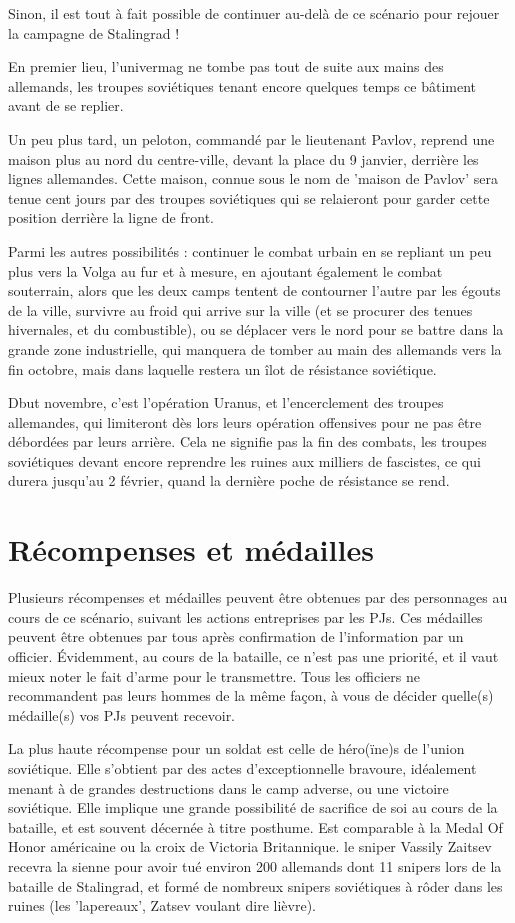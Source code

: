 \documentclass{report}
\begin{document}
\begin{multicols}{2}
Sinon, il est tout à fait possible de continuer au-delà de ce scénario pour rejouer la campagne de Stalingrad ! 

En premier lieu, l'univermag ne tombe pas tout de suite aux mains des allemands, les troupes soviétiques tenant encore quelques temps ce bâtiment avant de se replier.

Un peu plus tard, un peloton, commandé par le lieutenant Pavlov, reprend une maison plus au nord  du centre-ville, devant la place du 9 janvier, derrière les lignes allemandes. Cette maison, connue sous le nom de 'maison de Pavlov' sera tenue cent jours par des troupes soviétiques qui se relaieront pour garder cette position derrière la ligne de front.

Parmi les autres possibilités : continuer le combat urbain en se repliant un peu plus vers la Volga au fur et à mesure, en ajoutant également le combat souterrain, alors que les deux camps tentent de contourner l'autre par les égouts de la ville, survivre au froid qui arrive sur la ville (et se procurer des tenues hivernales, et du combustible), ou se déplacer vers le nord pour se battre dans la grande zone industrielle, qui manquera de tomber au main des allemands vers la fin octobre, mais dans laquelle restera un îlot de résistance soviétique.

Dbut novembre, c'est l'opération Uranus, et l'encerclement des troupes allemandes, qui limiteront dès lors leurs opération offensives pour ne pas être débordées par leurs arrière. Cela ne signifie pas la fin des combats, les troupes soviétiques devant encore reprendre les ruines aux milliers de fascistes, ce qui durera jusqu'au 2 février, quand la dernière poche de résistance se rend.
\section{Récompenses et médailles}
Plusieurs récompenses et médailles peuvent être obtenues par des personnages au cours de ce scénario, suivant les actions entreprises par les PJs. Ces médailles peuvent être obtenues par tous après confirmation de l'information par un officier. Évidemment, au cours de la bataille, ce n'est pas une priorité, et il vaut mieux noter le fait d'arme pour le transmettre. Tous les officiers ne recommandent pas leurs hommes de la même façon, à vous de décider quelle(s) médaille(s) vos PJs peuvent recevoir.

La plus haute récompense pour un soldat est celle de héro(ïne)s de l'union soviétique. Elle s'obtient par des actes d'exceptionnelle bravoure, idéalement menant à de grandes destructions dans le camp adverse, ou une victoire soviétique. Elle implique une grande possibilité de sacrifice de soi au cours de la bataille, et est souvent décernée à titre posthume. Est comparable à la Medal Of Honor américaine ou la croix de Victoria Britannique. le sniper Vassily Zaitsev recevra la sienne pour avoir tué environ 200 allemands dont 11 snipers lors de la bataille de Stalingrad, et formé de nombreux snipers soviétiques à rôder dans les ruines (les 'lapereaux', Zatsev voulant dire lièvre).


\end{multicols}
\end{document}

